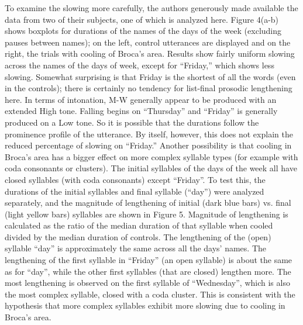 \documentclass[output=paper,
modfonts
]{LSP/langsci}
\begin{document}
To examine the slowing more carefully, the authors generously made available the data from two of their subjects, one of which is analyzed here.  Figure 4(a-b) shows boxplots for durations of the names of the days of the week (excluding pauses between names); on the left, control utterances are displayed and on the right, the trials with cooling of Broca's area. Results show fairly uniform slowing across the names of the days of week, except for ``Friday,'' which shows less slowing. Somewhat surprising is that Friday is the shortest of all the words (even in the controls); there is certainly no tendency for list-final prosodic lengthening here. In terms of intonation, M-W generally appear to be produced with an extended High tone. Falling begins on ``Thursday'' and ``Friday'' is generally produced on a Low tone. So it is possible that the durations follow the prominence profile of the utterance. By itself, however, this does not explain the reduced percentage of slowing on ``Friday.'' Another possibility is that cooling in Broca's area has a bigger effect on more complex syllable types (for example with coda consonants or clusters). The initial syllables of the days of the week all have closed syllables (with coda consonants) except ``Friday''. To test this, the durations of the initial syllables and final syllable (``day'') were analyzed separately, and the magnitude of lengthening of initial (dark blue bars) vs. final (light yellow bars) syllables are shown in Figure 5. Magnitude of lengthening is calculated as the ratio of the median duration of that syllable when cooled divided by the median duration of controls. The lengthening of the (open) syllable ``day'' is approximately the same across all the days' names. The lengthening of the first syllable in ``Friday'' (an open syllable) is about the same as for ``day'', while the other first syllables (that are closed) lengthen more. The most lengthening is observed on the first syllable of ``Wednesday'', which is also the most complex syllable, closed with a coda cluster.  This is consistent with the hypothesis that more complex syllables exhibit more slowing 
due to cooling in Broca's area.
\end{document}
